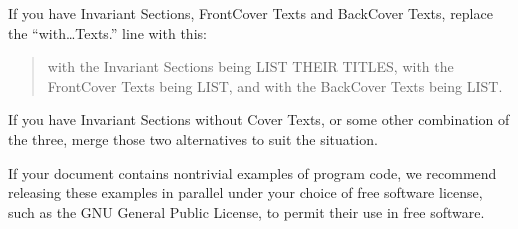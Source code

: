 \documentclass[letterpaper,10pt,english,openany,oneside]{sphinxmanual}
\begin{document}
\sphinxAtStartPar
If you have Invariant Sections, Front\sphinxhyphen{}Cover Texts and Back\sphinxhyphen{}Cover Texts,
replace the “with…Texts.” line with this:
\begin{quote}

\sphinxAtStartPar
with the Invariant Sections being LIST THEIR TITLES, with the
Front\sphinxhyphen{}Cover Texts being LIST, and with the Back\sphinxhyphen{}Cover Texts being
LIST.
\end{quote}

\sphinxAtStartPar
If you have Invariant Sections without Cover Texts, or some other
combination of the three, merge those two alternatives to suit the
situation.

\sphinxAtStartPar
If your document contains nontrivial examples of program code, we
recommend releasing these examples in parallel under your choice of free
software license, such as the GNU General Public License, to permit
their use in free software.

\endgroup

\sphinxstepscope

\cleardoublepage
\begingroup
\renewcommand\chapter[1]{\endgroup}
\end{document}
